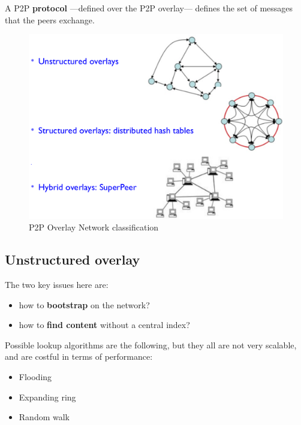 A P2P \textbf{protocol} ---defined over the P2P overlay--- defines the set of messages that the peers exchange.

\begin{figure}[htbp]
   \centering
   \includegraphics{images/overlayClassification.png}
   \caption{P2P Overlay Network classification}
   \label{fig:overlayClassification}
\end{figure}

\subsection{Unstructured overlay}
\begin{paracol}{2}
   \colfill
   The two key issues here are:
   \begin{itemize}
   \item
   how to \textbf{bootstrap} on the network?
   \item
   how to \textbf{find content} without a central index?
\end{itemize}
\colfill
\switchcolumn
Possible lookup algorithms are the following, but they all are not very scalable, and are costful in terms of performance:
\begin{itemize}
   \item Flooding
   \item Expanding ring
   \item Random walk
\end{itemize}
\end{paracol}
